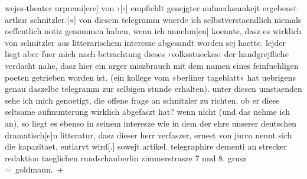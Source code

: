\begin{ledgroupsized}[t]{13cm}
                  wejsz-theater urpremi{[}ere{]} von ›\label{K_L02634-1v}\label{K_L02634-1h}{[}‹{]} empfiehlt genejgter aufmerksamkejt
               ergebenst arthur schnitzler.{[}«{]} von diesem telegramm wuerde ich
               selbstverstaendlich niemals oeffentlich notiz genommen haben, wenn ich
                  annehm{[}en{]} koennte, dasz es wirklich von schnitzler aus {\pb}litterarischem interesze abgesandt worden sej haette.
               lejder liegt aber fuer mich nach betrachtung dieses ›volksstueckes‹ der handgrejfliche verdacht
               nahe, dasz hier ein arger miszbrauch mit dem namen eines feinfuehligen poeten
               getrieben worden ist. (ein kollege vom »berliner
                  tageblatt« hat uebrigens genau daszelbe telegramm zur selbigen
                  stunde erhalten). unter diesen umstaenden sehe ich mich genoetigt,
               die offene frage an schnitzler zu richten, ob er diese seltsame aufmunterung wirklich
               abgefaszt hat? wenn nicht (und das nehme ich an), so liegt es ebenso in seinem
               interesze wie in dem der ehre unserer deutschen dramatisch{[}e{]}n
               litteratur, dasz dieser herr verfaszer, ernest von jurco nennt sich
               die kapazitaet, entlarvt
                  wird{[}.{]} sowejt artikel. telegraphire dementi an strecker redaktion taeglichen rundschauberlin zimmerstrasze 7 und 8. grusz \spacefill\mbox{=
                  goldmann. +}\pend
                     \endnumbering{}\end{ledgroupsized}  \newcommand{\dateiname}{L02634}\newcommand{\titel}{Paul Goldmann an Arthur Schnitzler, 26. 4. 1902}\newcommand{\editorInnen}{Martin Anton Müller und Laura Untner}
            \footnotesize
\begin{ledgroupsized}[t]{11.5cm}
\end{ledgroupsized}
         
      